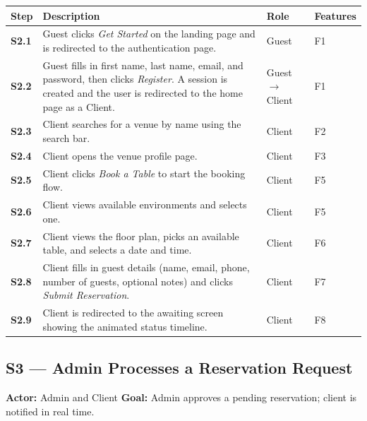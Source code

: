 \documentclass[12pt,a4paper]{article}
\begin{document}
\begin{longtable}{>{\bfseries}l L{6.5cm} l L{3cm}}
    \toprule
    Step & Description & Role & Features \\
    \midrule
    S2.1 & Guest clicks \emph{Get Started} on the landing page and is
           redirected to the authentication page. & Guest & F1 \\
    S2.2 & Guest fills in first name, last name, email, and password,
           then clicks \emph{Register}. A session is created and the
           user is redirected to the home page as a Client. & Guest $\to$ Client & F1 \\
    S2.3 & Client searches for a venue by name using the search bar. & Client & F2 \\
    S2.4 & Client opens the venue profile page. & Client & F3 \\
    S2.5 & Client clicks \emph{Book a Table} to start the booking flow. & Client & F5 \\
    S2.6 & Client views available environments and selects one. & Client & F5 \\
    S2.7 & Client views the floor plan, picks an available table,
           and selects a date and time. & Client & F6 \\
    S2.8 & Client fills in guest details (name, email, phone, number of
           guests, optional notes) and clicks \emph{Submit Reservation}. & Client & F7 \\
    S2.9 & Client is redirected to the awaiting screen showing the
           animated status timeline. & Client & F8 \\
    \bottomrule
\end{longtable}

\subsection*{S3 --- Admin Processes a Reservation Request}
\begin{mdframed}[style=scenariobox]
\textbf{Actor:} Admin and Client \quad
\textbf{Goal:} Admin approves a pending reservation; client is notified
in real time.
\end{mdframed}
\end{document}
